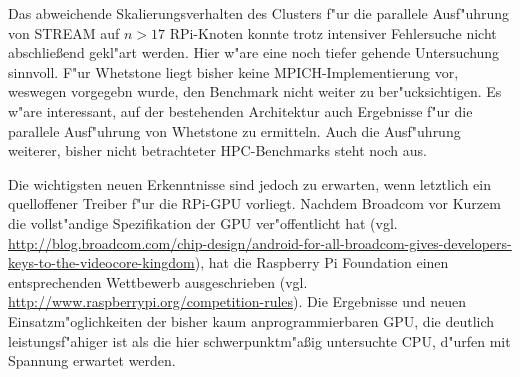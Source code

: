 Das abweichende Skalierungsverhalten des Clusters f"ur die parallele Ausf"uhrung von STREAM auf $n>17$ RPi-Knoten konnte trotz intensiver Fehlersuche nicht abschlie\ss end gekl"art werden. Hier w"are eine noch tiefer gehende Untersuchung sinnvoll. F"ur Whetstone liegt bisher keine MPICH-Implementierung vor, weswegen vorgegebn wurde, den Benchmark nicht weiter zu ber"ucksichtigen. Es w"are interessant, auf der bestehenden Architektur auch Ergebnisse f"ur die parallele Ausf"uhrung von Whetstone zu ermitteln. Auch die Ausf"uhrung weiterer, bisher nicht betrachteter HPC-Benchmarks steht noch aus. 

Die wichtigsten neuen Erkenntnisse sind jedoch zu erwarten, wenn letztlich ein quelloffener Treiber f"ur die RPi-GPU vorliegt. Nachdem Broadcom vor Kurzem die vollst"andige Spezifikation der GPU ver"offentlicht hat (vgl. \url{http://blog.broadcom.com/chip-design/android-for-all-broadcom-gives-developers-keys-to-the-videocore-kingdom}), hat die Raspberry Pi Foundation einen entsprechenden Wettbewerb ausgeschrieben (vgl. \url{http://www.raspberrypi.org/competition-rules}). Die Ergebnisse und neuen Einsatzm"oglichkeiten der bisher kaum anprogrammierbaren GPU, die deutlich leistungsf"ahiger ist als die hier schwerpunktm"a\ss ig untersuchte CPU, d"urfen mit Spannung erwartet werden. 
\endinput